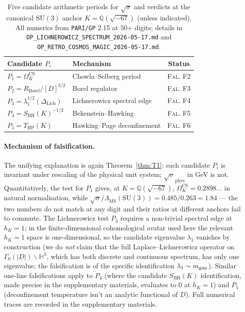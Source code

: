 \documentclass[aps,prl,reprint,superscriptaddress,floatfix,nofootinbib,amssymb]{revtex4-2}
\theoremstyle{definition}
\theoremstyle{remark}
\newcommand{\Q}{\mathbb{Q}}
\newcommand{\msb}{\overline{\mathrm{MS}}}
\begin{document}
\begin{table}[hb!]
\caption{Five candidate arithmetic periods for $\sqrt{\sigma}$ and
verdicts at the canonical $\mathrm{SU}(3)$ anchor $K = \Q(\sqrt{-67})$
(unless indicated). All numerics from \texttt{PARI/GP} 2.15
at $50$+ digits; details in
\texttt{OP\_LICHNEROWICZ\_SPECTRUM\_2026-05-17.md} and
\texttt{OP\_RETRO\_COSMOS\_MAGIC\_2026-05-17.md}.}
\label{tab:T2}
\centering
\small
\begin{tabular}{@{}llc@{}}
\toprule
Candidate $P_i$ & Mechanism & Status \\
\midrule
$P_1 = \Omega_K^{\mathrm{CS}}$ &
Chowla--Selberg \cite{ChowlaSelberg1949} period &
\textsc{Fal.} F2 \\
$P_2 = R_{\mathrm{Borel}}/[D]^{3/2}$ &
Borel regulator \cite{Borel1974} &
\textsc{Fal.} F3 \\
$P_3 = \lambda_1^{1/2}(\Delta_{\mathrm{Lich}})$ &
Lichnerowicz spectral edge \cite{Lichnerowicz1963} &
\textsc{Fal.} F4 \\
$P_4 = S_{\mathrm{BH}}(K)^{-1/2}$ &
Bekenstein--Hawking \cite{Bekenstein1973,Hawking1975} &
\textsc{Fal.} F5 \\
$P_5 = T_{\mathrm{HP}}(K)$ &
Hawking--Page deconfinement \cite{HawkingPage1983} &
\textsc{Fal.} F6 \\
\bottomrule
\end{tabular}
\end{table}

\paragraph{Mechanism of falsification.}
The unifying explanation is again Theorem~\ref{thm:T1}: each
candidate $P_i$ is invariant under rescaling of the physical unit
system; $\sqrt{\sigma}_{\mathrm{phys}}$ in GeV is not. Quantitatively,
the test for $P_1$ gives, at $K=\Q(\sqrt{-67})$,
$\Omega_K^{\mathrm{CS}} = 0.2898\ldots$ in natural normalisation,
while $\sqrt{\sigma}/\Lambda_{\msb}(\mathrm{SU(3)}) =
0.485/0.263 = 1.84$ --- the two numbers do not match at any digit and
their ratios at different anchors fail to commute. The Lichnerowicz
test $P_3$ requires a non-trivial spectral edge at $h_K=1$; in the
finite-dimensional cohomological avatar used here the relevant
$h_K=1$ space is one-dimensional, so the candidate eigenvalue
$\lambda_1$ vanishes by construction (we do \emph{not} claim that
the full Laplace--Lichnerowicz operator on
$\Gamma_0(|D|)\backslash\mathbb H^3$, which has both discrete and
continuous spectrum, has only one eigenvalue; the falsification is
of the specific identification $\lambda_1 \sim m_{\rm gap}$).
Similar one-line falsifications apply to $P_4$ (where the candidate
$S_{\mathrm{BH}}(K)$ identification, made precise in the
supplementary materials, evaluates to $0$ at $h_K=1$) and $P_5$
(deconfinement temperature isn't an analytic functional of $D$). Full numerical traces are
recorded in the supplementary materials.
\end{document}
